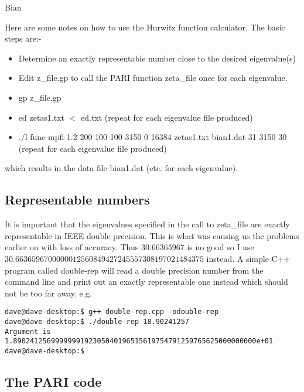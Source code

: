 \documentclass[12pt,a4paper]{article}
\begin{document}
\pagestyle{fancy}
\setlength{\headheight}{15pt}
\setlength{\parindent}{0in}
\setlength{\parskip}{0.15in}
\newcommand{\N}{{\sf N\hspace*{-1.0ex}
\rule{0.15ex}{1.3ex}\hspace*{1.0ex}}}

Bian

Here are some notes on how to use the Hurwitz function calculator. The basic steps are:-
\begin{itemize}
\item Determine an exactly representable number close to the desired eigenvalue(s)
\item Edit z\_file.gp to call the PARI function zeta\_file once for each eigenvalue.
\item gp z\_file.gp
\item ed zetas1.txt $<$ ed.txt (repeat for each eigenvalue file produced)
\item ./l-func-mpfi-1.2 200 100 100 3150 0 16384 zetas1.txt bian1.dat 31 3150 30 (repeat for each eigenvalue file produced)
\end{itemize}
which results in the data file bian1.dat (etc. for each eigenvalue).

\subsection{Representable numbers}

It is important that the eigenvalues specified in the call to zeta\_file are exactly representable in IEEE double precision. This is what was causing us the problems earlier on with loss of accuracy. Thus $30.66365967$ is no good so I use $30.6636596700000012560849427245557308197021484375$ instead. A simple C++ program called double-rep will read a double precision number from the command line and print out an exactly representable one instead which should not be too far away. e.g.
\begin{verbatim}
dave@dave-desktop:$ g++ double-rep.cpp -odouble-rep
dave@dave-desktop:$ ./double-rep 18.90241257
Argument is 1.8902412569999999192305040196515619754791259765625000000000e+01
dave@dave-desktop:$ 
\end{verbatim}

\subsection{The PARI code}
\end{document}
